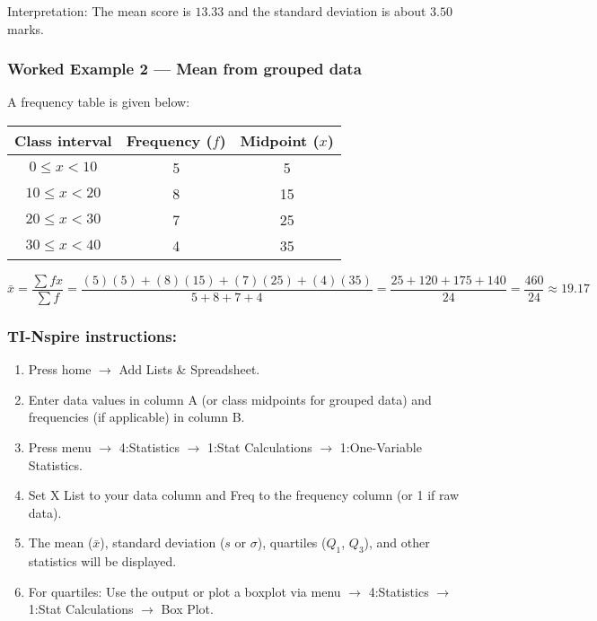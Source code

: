 \documentclass[11pt]{article}
\def\textbf#1{#1}%
\def\texttt#1{#1}%
\begin{document}
\textbf{Interpretation:} The mean score is $13.33$ and the standard deviation is about $3.50$ marks.

\subsubsection*{Worked Example 2 — Mean from grouped data}
A frequency table is given below:

\begin{center}
\begin{tabular}{c|c|c}
\textbf{Class interval} & \textbf{Frequency ($f$)} & \textbf{Midpoint ($x$)} \\ \hline
$0 \leq x < 10$ & 5 & 5 \\
$10 \leq x < 20$ & 8 & 15 \\
$20 \leq x < 30$ & 7 & 25 \\
$30 \leq x < 40$ & 4 & 35
\end{tabular}
\end{center}

\[
\bar{x} = \frac{\sum f x}{\sum f} 
= \frac{(5)(5) + (8)(15) + (7)(25) + (4)(35)}{5+8+7+4}
= \frac{25 + 120 + 175 + 140}{24} 
= \frac{460}{24} \approx 19.17
\]

\subsubsection*{TI-Nspire instructions:}

\begin{enumerate}
    \item Press \texttt{home} $\rightarrow$ \texttt{Add Lists \& Spreadsheet}.
    \item Enter data values in column A (or class midpoints for grouped data) and frequencies (if applicable) in column B.
    \item Press \texttt{menu} $\rightarrow$ \texttt{4:Statistics} $\rightarrow$ \texttt{1:Stat Calculations} $\rightarrow$ \texttt{1:One-Variable Statistics}.
    \item Set \texttt{X List} to your data column and \texttt{Freq} to the frequency column (or 1 if raw data).
    \item The mean ($\bar{x}$), standard deviation ($s$ or $\sigma$), quartiles ($Q_1$, $Q_3$), and other statistics will be displayed.
    \item For quartiles: Use the output or plot a boxplot via \texttt{menu} $\rightarrow$ \texttt{4:Statistics} $\rightarrow$ \texttt{1:Stat Calculations} $\rightarrow$ \texttt{Box Plot}.
\end{enumerate}
\end{document}
